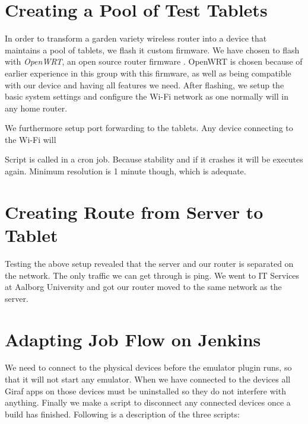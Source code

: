 \section{Creating a Pool of Test Tablets}
In order to transform a garden variety wireless router into a device that maintains a pool of tablets, we flash it custom firmware. We have chosen to flash with \emph{OpenWRT}, an open source router firmware . OpenWRT is chosen because of earlier experience in this group with this firmware, as well as being compatible with our device and having all features we need. After flashing, we setup the basic system settings and configure the Wi-Fi network as one normally will in any home router.

We furthermore setup port forwarding to the tablets. Any device connecting to the Wi-Fi will 

Script is called in a cron job. Because stability and if it crashes it will be executes again. Minimum resolution is 1 minute though, which is adequate. 

\section{Creating Route from Server to Tablet}
Testing the above setup revealed that the server and our router is separated on the network. The only traffic we can get through is ping. We went to IT Services at Aalborg University and got our router moved to the same network as the server. 

\section{Adapting Job Flow on Jenkins}
We need to connect to the physical devices before the emulator plugin runs, so that it will not start any emulator. When we have connected to the devices all Giraf apps on those devices must be uninstalled so they do not interfere with anything. Finally we make a script to disconnect any connected devices once a build has finished. Following is a description of the three scripts:


